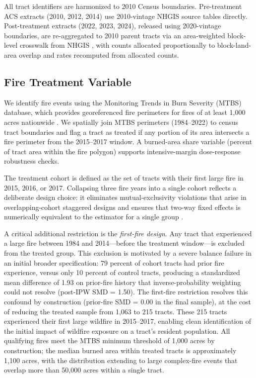 \documentclass[12pt]{article}
\begin{document}
All tract identifiers are harmonized to 2010 Census boundaries.
Pre-treatment ACS extracts (2010, 2012, 2014) use 2010-vintage NHGIS
source tables directly.
Post-treatment extracts (2022, 2023, 2024), released using 2020-vintage
boundaries, are re-aggregated to 2010 parent tracts via an area-weighted
block-level crosswalk from NHGIS
\citep{NHGIS2024},
with counts allocated proportionally to block-land-area overlap
and rates recomputed from allocated counts.

\subsection{Fire Treatment Variable}

We identify fire events using the Monitoring Trends in Burn Severity (MTBS)
database, which provides georeferenced fire perimeters for fires of at least
1,000 acres nationwide \citep{MTBS2022}.
We spatially join MTBS perimeters (1984--2022) to census tract boundaries
and flag a tract as treated if any portion of its area intersects a fire
perimeter from the 2015--2017 window.
A burned-area share variable (percent of tract area within the fire polygon)
supports intensive-margin dose-response robustness checks.

The treatment cohort is defined as the set of tracts with their first large
fire in 2015, 2016, or 2017.
Collapsing three fire years into a single cohort reflects a deliberate
design choice: it eliminates mutual-exclusivity violations that arise
in overlapping-cohort staggered designs and ensures that two-way fixed
effects is numerically equivalent to the
\citet{callaway2021difference} estimator for a single group \citep{goodman2021difference}.

A critical additional restriction is the \emph{first-fire design}.
Any tract that experienced a large fire between 1984 and 2014---before
the treatment window---is excluded from the treated group.
This exclusion is motivated by a severe balance failure in an initial
broader specification: 79 percent of cohort tracts had prior fire
experience, versus only 10 percent of control tracts, producing a
standardized mean difference of 1.93 on prior-fire history that
inverse-probability weighting could not resolve (post-IPW SMD = 1.50).
The first-fire restriction resolves this confound by construction
(prior-fire SMD = 0.00 in the final sample), at the cost of reducing
the treated sample from 1,063 to 215 tracts.
These 215 tracts experienced their first large wildfire in 2015--2017,
enabling clean identification of the initial impact of wildfire exposure
on a tract's resident population.
All qualifying fires meet the MTBS minimum threshold of 1,000 acres by construction;
the median burned area within treated tracts is approximately 1,100 acres,
with the distribution extending to large complex-fire events that overlap
more than 50,000 acres within a single tract.
\end{document}
